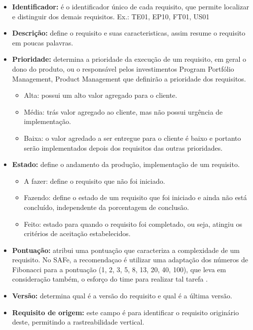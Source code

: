 \begin{itemize}
    \item \textbf{Identificador:} é o identificador único de cada requisito, que permite localizar e distinguir dos demais requisitos.
    \newline Ex.: TE01, EP10, FT01, US01
    \item \textbf{Descrição:} define o requisito e suas caracteristicas, assim resume o requisito em poucas palavras.
    \item \textbf{Prioridade:} determina a prioridade da execução de um requisito, em geral o dono do produto, ou o responsável pelos investimentos Program Portfólio Management, Product Management que definirão a prioridade dos requisitos.
    \begin{itemize}
        \item Alta: possui um alto valor agregado para o cliente.
        \item Média: trás valor agregado ao cliente, mas não possui urgência de implementação.
        \item Baixa: o valor agredado a ser entregue para o cliente é baixo e portanto serão implementados depois dos requisitos das outras prioridades.
    \end{itemize}
    \item \textbf{Estado:} define o andamento da produção, implementação de um requisito.
    \begin{itemize}
        \item A fazer: define o requisito que não foi iniciado.
        \item Fazendo: define o estado de um requisito que foi iniciado e ainda não está concluído, independente da porcentagem de conclusão.
        \item Feito: estado para quando o requisito foi completado, ou seja, atingiu os critérios de aceitação estabelecidos.
    \end{itemize}
    \item \textbf{Pontuação:} atribui uma pontuação que caracteriza a complexidade de um requisito. No SAFe, a recomendaçao é utilizar uma adaptação dos números de Fibonacci para a pontuação (1, 2, 3, 5, 8, 13, 20, 40, 100), que leva em consideração também, o esforço do time para realizar tal tarefa \cite{safe}.
    \item \textbf{Versão:} determina qual é a versão do requisito e qual é a última versão.
    \item \textbf{Requisito de origem:} este campo é para identificar o requisito originário deste, permitindo a rastreabilidade vertical.
\end{itemize}


